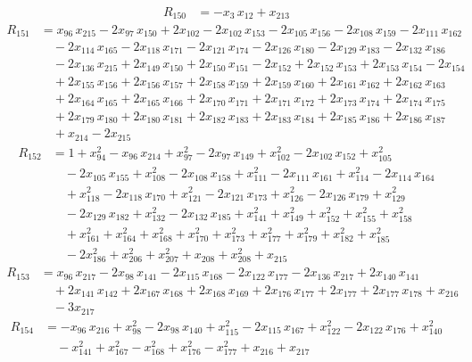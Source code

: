 \begin{align*}
R_{150} &= -x_{3}\,x_{12} +x_{213}
\end{align*}
\begin{align*}
R_{151} &= x_{96}\,x_{215} -2x_{97}\,x_{150} +2x_{102} -2x_{102}\,x_{153} -2x_{105}\,x_{156} -2x_{108}\,x_{159} -2x_{111}\,x_{162} \\
&\quad {} -2x_{114}\,x_{165} -2x_{118}\,x_{171} -2x_{121}\,x_{174} -2x_{126}\,x_{180} -2x_{129}\,x_{183} -2x_{132}\,x_{186} \\
&\quad {} -2x_{136}\,x_{215} +2x_{149}\,x_{150} +2x_{150}\,x_{151} -2x_{152} +2x_{152}\,x_{153} +2x_{153}\,x_{154} -2x_{154} \\
&\quad {} +2x_{155}\,x_{156} +2x_{156}\,x_{157} +2x_{158}\,x_{159} +2x_{159}\,x_{160} +2x_{161}\,x_{162} +2x_{162}\,x_{163} \\
&\quad {} +2x_{164}\,x_{165} +2x_{165}\,x_{166} +2x_{170}\,x_{171} +2x_{171}\,x_{172} +2x_{173}\,x_{174} +2x_{174}\,x_{175} \\
&\quad {} +2x_{179}\,x_{180} +2x_{180}\,x_{181} +2x_{182}\,x_{183} +2x_{183}\,x_{184} +2x_{185}\,x_{186} +2x_{186}\,x_{187} \\
&\quad {} +x_{214} -2x_{215}
\end{align*}
\begin{align*}
R_{152} &= 1 +x_{94}^{2} -x_{96}\,x_{214} +x_{97}^{2} -2x_{97}\,x_{149} +x_{102}^{2} -2x_{102}\,x_{152} +x_{105}^{2} \\
&\quad {} -2x_{105}\,x_{155} +x_{108}^{2} -2x_{108}\,x_{158} +x_{111}^{2} -2x_{111}\,x_{161} +x_{114}^{2} -2x_{114}\,x_{164} \\
&\quad {} +x_{118}^{2} -2x_{118}\,x_{170} +x_{121}^{2} -2x_{121}\,x_{173} +x_{126}^{2} -2x_{126}\,x_{179} +x_{129}^{2} \\
&\quad {} -2x_{129}\,x_{182} +x_{132}^{2} -2x_{132}\,x_{185} +x_{141}^{2} +x_{149}^{2} +x_{152}^{2} +x_{155}^{2} +x_{158}^{2} \\
&\quad {} +x_{161}^{2} +x_{164}^{2} +x_{168}^{2} +x_{170}^{2} +x_{173}^{2} +x_{177}^{2} +x_{179}^{2} +x_{182}^{2} +x_{185}^{2} \\
&\quad {} -2x_{186}^{2} +x_{206}^{2} +x_{207}^{2} +x_{208} +x_{208}^{2} +x_{215}
\end{align*}
\begin{align*}
R_{153} &= x_{96}\,x_{217} -2x_{98}\,x_{141} -2x_{115}\,x_{168} -2x_{122}\,x_{177} -2x_{136}\,x_{217} +2x_{140}\,x_{141} \\
&\quad {} +2x_{141}\,x_{142} +2x_{167}\,x_{168} +2x_{168}\,x_{169} +2x_{176}\,x_{177} +2x_{177} +2x_{177}\,x_{178} +x_{216} \\
&\quad {} -3x_{217}
\end{align*}
\begin{align*}
R_{154} &= -x_{96}\,x_{216} +x_{98}^{2} -2x_{98}\,x_{140} +x_{115}^{2} -2x_{115}\,x_{167} +x_{122}^{2} -2x_{122}\,x_{176} +x_{140}^{2} \\
&\quad {} -x_{141}^{2} +x_{167}^{2} -x_{168}^{2} +x_{176}^{2} -x_{177}^{2} +x_{216} +x_{217}
\end{align*}
